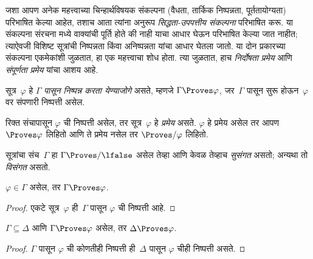 \begin{explain}
जशा आपण अनेक महत्त्वाच्या चिन्हार्थविषयक संकल्पना
(वैधता, तार्किक निष्पन्नता, पूर्ततायोग्यता)
परिभाषित केल्या आहेत, तशाच आता त्यांना अनुरूप
\emph{सिद्धता-उपपत्तीय संकल्पना} परिभाषित करू. या संकल्पना संरचना
मध्ये वाक्यांची पूर्ति होते की नाही याचा आधार घेऊन परिभाषित केल्या
जात नाहीत; त्याऐवजी विशिष्ट सूत्रांची निष्पन्नता किंवा
अनिष्पन्नता यांचा आधार घेतला जातो. या दोन प्रकारच्या संकल्पना
एकमेकांशी जुळतात, हा एक महत्त्वाचा शोध होता. त्या जुळतात, हाच
\emph{निर्दोषता प्रमेय} आणि \emph{संपूर्णता प्रमेय} यांचा आशय आहे.
\end{explain}

\begin{defn}[निष्पन्नता]
सूत्र~$\varphi$ हे $\Gamma$ \emph{पासून निष्पन्न करता येण्याजोगे} असते, म्हणजे
$\Gamma \Proves \varphi$, जर~$\Gamma$ पासून सुरू होऊन~$\varphi$ वर संपणारी
निष्पत्ती असेल.
\end{defn}

\begin{defn}[प्रमेये]
रिक्त संचापासून $\varphi$ ची निष्पत्ती असेल, तर सूत्र~$\varphi$ हे
\emph{प्रमेय} असते. $\varphi$ हे प्रमेय असेल तर आपण $\Proves \varphi$ लिहितो आणि
ते प्रमेय नसेल तर $\Proves/ \varphi$ लिहितो.
\end{defn}

\begin{defn}[सुसंगतता]
सूत्रांचा संच~$\Gamma$ हा $\Gamma\Proves/ \lfalse$ असेल तेव्हा आणि
केवळ तेव्हाच \emph{सुसंगत} असतो; अन्यथा तो \emph{विसंगत} असतो.
\end{defn}

\begin{prop}[परावर्तिता]
\label{fol:axd:ptn:prop:reflexivity}
$\varphi \in \Gamma$ असेल, तर $\Gamma \Proves \varphi$.
\end{prop}

\begin{proof}
  एकटे सूत्र~$\varphi$ ही~$\Gamma$ पासून $\varphi$ ची निष्पत्ती आहे.
\end{proof}

\begin{prop}[एकस्वनिकता]
\label{fol:axd:ptn:prop:monotonicity}
$\Gamma \subseteq \Delta$ आणि $\Gamma \Proves \varphi$ असेल, तर $\Delta
\Proves \varphi$.
\end{prop}

\begin{proof}
$\Gamma$ पासून $\varphi$ ची कोणतीही निष्पत्ती ही~$\Delta$ पासून $\varphi$ चीही
निष्पत्ती असते.
\end{proof}

